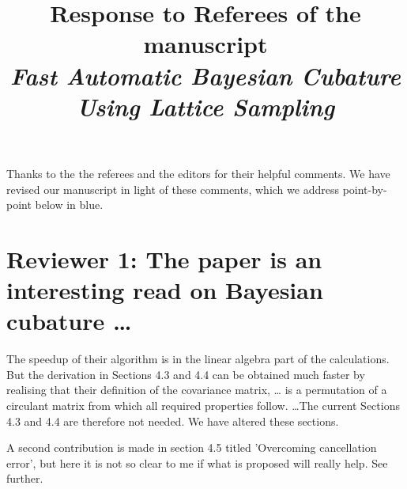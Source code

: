 \documentclass{amsart}
\begin{document}
\title[Response for Fast Automatic Bayesian Cubature]{Response to Referees of the manuscript \\
\emph{Fast Automatic Bayesian Cubature Using Lattice Sampling}}
\maketitle

\newcommand{\Response}[1]{{\color{blue}#1}}
\renewcommand{\vec}[1]{\boldsymbol{#1}}
\newcommand{\vtheta}{\vec{\theta}}

Thanks to the the referees and the editors for their helpful comments.  We have revised our manuscript in light of these comments, \Response{which we address point-by-point below in blue.}

\section*{Reviewer 1: The paper is an interesting read on Bayesian cubature \ldots}

The speedup of their algorithm is in the linear algebra part of the
calculations. But the derivation in Sections 4.3 and 4.4 can be obtained much
faster by realising that their definition of the covariance matrix, \ldots 
is a permutation of a circulant matrix from which all required properties follow. \ldots The current Sections 4.3 and 4.4 are therefore not
needed. \Response{We have altered these sections.}

A second contribution is made in section 4.5 titled 'Overcoming cancellation
error', but here it is not so clear to me if what is proposed will really help.
See further.
\end{document}
